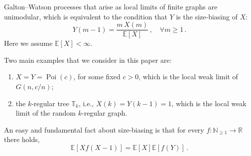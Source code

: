 \documentclass[10pt,a4paper]{amsart}
\numberwithin{equation}{section}
\newcommand{\E}{\mathbb E}
\newcommand{\N}{\mathbb N}
\newcommand{\bbT}{\mathbb T}
\newcommand{\R}{\mathbb R}
\begin{document}
Galton--Watson processes that arise as local limits of finite graphs are unimodular, which is equivalent to the condition that $Y$ is the size-biasing of $X$:
\begin{equation}\label{eq:size_bias}
Y(m-1)=\frac{m\,X(m)}{\E[X]}\,,\quad\forall m\ge 1\,.
\end{equation}
Here we assume $\E[X]<\infty$.

Two main examples that we consider in this paper are:
\begin{enumerate}
    \item \(X=Y=\operatorname{Poi}(c)\), for some fixed \(c>0\), which is the
    local weak limit of \(G(n,c/n)\);
    \item the \(k\)-regular tree \(\bbT_k\), i.e.,
    \(X(k)=Y(k-1)=1\), which is the local weak limit of the random
    \(k\)-regular graph.
\end{enumerate}


An easy and fundamental fact about size-biasing is that for every $f:\N_{\ge 1}\to\R$ there holds,
\begin{equation}\label{eq:sizeBiasF}
\E[Xf(X-1)] = \E[X]\E[f(Y)]\,.
\end{equation}
\end{document}
